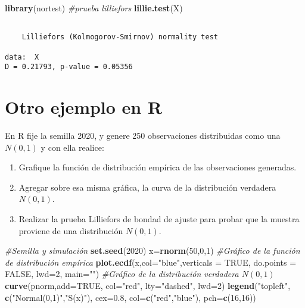 \documentclass[
  a4paper,
  oneside,
  openany]{book}
\newenvironment{Shaded}{\begin{snugshade}}{\end{snugshade}}
\newcommand{\AttributeTok}[1]{\textcolor[rgb]{0.13,0.29,0.53}{#1}}
\newcommand{\CommentTok}[1]{\textcolor[rgb]{0.56,0.35,0.01}{\textit{#1}}}
\newcommand{\ConstantTok}[1]{\textcolor[rgb]{0.56,0.35,0.01}{#1}}
\newcommand{\DecValTok}[1]{\textcolor[rgb]{0.00,0.00,0.81}{#1}}
\newcommand{\FloatTok}[1]{\textcolor[rgb]{0.00,0.00,0.81}{#1}}
\newcommand{\FunctionTok}[1]{\textcolor[rgb]{0.13,0.29,0.53}{\textbf{#1}}}
\newcommand{\NormalTok}[1]{#1}
\newcommand{\OtherTok}[1]{\textcolor[rgb]{0.56,0.35,0.01}{#1}}
\newcommand{\StringTok}[1]{\textcolor[rgb]{0.31,0.60,0.02}{#1}}
\begin{document}
\begin{Shaded}
\begin{Highlighting}[]
\FunctionTok{library}\NormalTok{(nortest) }\CommentTok{\#prueba lilliefors}
\FunctionTok{lillie.test}\NormalTok{(X)}
\end{Highlighting}
\end{Shaded}

\begin{verbatim}

    Lilliefors (Kolmogorov-Smirnov) normality test

data:  X
D = 0.21793, p-value = 0.05356
\end{verbatim}

\hypertarget{otro-ejemplo-en-r-1}{%
\section{Otro ejemplo en R}\label{otro-ejemplo-en-r-1}}

En R fije la semilla 2020, y genere 250 observaciones distribuidas como una \(N(0, 1)\) y con ella realice:

\begin{enumerate}
\item Grafique la función de distribución empírica de las observaciones generadas.
\item Agregar sobre esa misma gráfica, la curva de la distribución verdadera $N(0,1)$. 
\item Realizar la prueba Lilliefors de bondad de ajuste para probar que la muestra proviene de una distribución $N(0,1)$.
\end{enumerate}

\begin{Shaded}
\begin{Highlighting}[]
\CommentTok{\#Semilla y simulación}
\FunctionTok{set.seed}\NormalTok{(}\DecValTok{2020}\NormalTok{)}
\NormalTok{x}\OtherTok{=}\FunctionTok{rnorm}\NormalTok{(}\DecValTok{50}\NormalTok{,}\DecValTok{0}\NormalTok{,}\DecValTok{1}\NormalTok{)}
\CommentTok{\#Gráfico de la función de distribución empírica}
\FunctionTok{plot.ecdf}\NormalTok{(x,}\AttributeTok{col=}\StringTok{"blue"}\NormalTok{,}\AttributeTok{verticals =} \ConstantTok{TRUE}\NormalTok{, }\AttributeTok{do.points =} \ConstantTok{FALSE}\NormalTok{, }\AttributeTok{lwd=}\DecValTok{2}\NormalTok{, }\AttributeTok{main=}\StringTok{""}\NormalTok{)}
\CommentTok{\#Gráfico de la distribución verdadera $N(0,1)$}
\FunctionTok{curve}\NormalTok{(pnorm,}\AttributeTok{add=}\ConstantTok{TRUE}\NormalTok{, }\AttributeTok{col=}\StringTok{"red"}\NormalTok{, }\AttributeTok{lty=}\StringTok{"dashed"}\NormalTok{, }\AttributeTok{lwd=}\DecValTok{2}\NormalTok{)}
\FunctionTok{legend}\NormalTok{(}\StringTok{"topleft"}\NormalTok{, }\FunctionTok{c}\NormalTok{(}\StringTok{"Normal(0,1)"}\NormalTok{,}\StringTok{"S(x)"}\NormalTok{), }\AttributeTok{cex=}\FloatTok{0.8}\NormalTok{, }\AttributeTok{col=}\FunctionTok{c}\NormalTok{(}\StringTok{"red"}\NormalTok{,}\StringTok{"blue"}\NormalTok{), }\AttributeTok{pch=}\FunctionTok{c}\NormalTok{(}\DecValTok{16}\NormalTok{,}\DecValTok{16}\NormalTok{))}
\end{Highlighting}
\end{Shaded}
\end{document}
